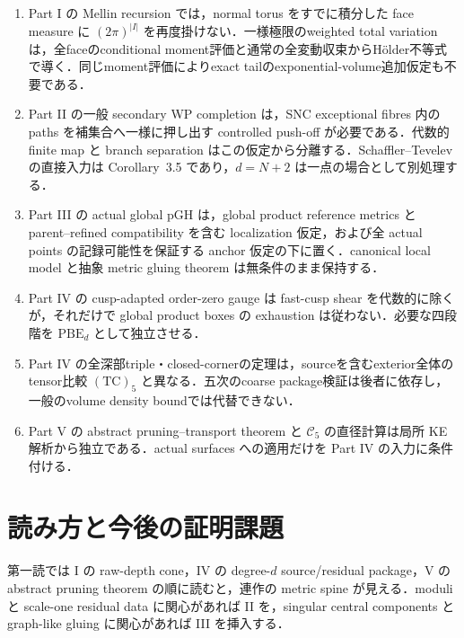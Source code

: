 \documentclass[a4paper,11pt]{ltjsarticle}
\numberwithin{equation}{section}
\theoremstyle{plain}
\theoremstyle{definition}
\theoremstyle{remark}
\newcommand{\cC}{\mathcal C}
\begin{document}
\begin{enumerate}[label=\textup{(A\arabic*)}]
\item Part I の Mellin recursion では，normal torus をすでに積分した face measure に \((2\pi)^{|I|}\) を再度掛けない．一様極限のweighted total variationは，全faceのconditional moment評価と通常の全変動収束からH\"older不等式で導く．同じmoment評価によりexact tailのexponential-volume追加仮定も不要である．
\item Part II の一般 secondary WP completion は，SNC exceptional fibres 内の paths を補集合へ一様に押し出す controlled push-off が必要である．代数的 finite map と branch separation はこの仮定から分離する．Schaffler--Tevelev の直接入力は Corollary~3.5 であり，\(d=N+2\) は一点の場合として別処理する．
\item Part III の actual global pGH は，global product reference metrics と parent--refined compatibility を含む localization 仮定，および全 actual points の記録可能性を保証する anchor 仮定の下に置く．canonical local model と抽象 metric gluing theorem は無条件のまま保持する．
\item Part IV の cusp-adapted order-zero gauge は fast-cusp shear を代数的に除くが，それだけで global product boxes の exhaustion は従わない．必要な四段階を \(\mathrm{PBE}_d\) として独立させる．
\item Part IV の全深部triple・closed-cornerの定理は，sourceを含むexterior全体のtensor比較 \(\mathrm{(TC)}_5\) と異なる．五次のcoarse package検証は後者に依存し，一般のvolume density boundでは代替できない．
\item Part V の abstract pruning--transport theorem と \(\cC_5\) の直径計算は局所 KE 解析から独立である．actual surfaces への適用だけを Part IV の入力に条件付ける．
\end{enumerate}

\section{読み方と今後の証明課題}

第一読では I の raw-depth cone，IV の degree-\(d\) source/residual package，V の abstract pruning theorem の順に読むと，連作の metric spine が見える．moduli と scale-one residual data に関心があれば II を，singular central components と graph-like gluing に関心があれば III を挿入する．
\end{document}
